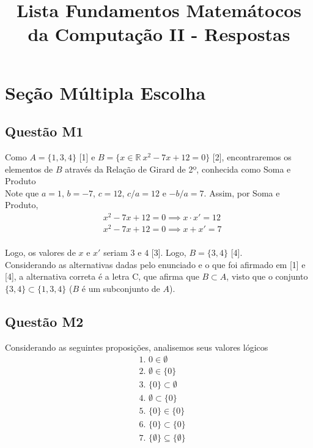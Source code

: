 \documentclass{article}
\title{Lista Fundamentos Matemátocos da Computação II - Respostas}
\begin{document}
\maketitle

\section{Seção Múltipla Escolha}

\subsection{Questão M1} 
Como $A = \{1, 3, 4\}$ [1] e $B = \{ x \in \mathbb{R} \ x^2 - 7x + 12 = 0\}$ [2], encontraremos os elementos de $B$ através da Relação de Girard de 2º, conhecida como Soma e Produto \\

Note que $a = 1$, $b = - 7$, $c = 12$, $c/a = 12$ e $-b/a = 7$. Assim, por Soma e Produto,
\[
\begin{aligned}
& x^2 - 7x + 12 = 0 \implies x \cdot x' = 12 \\
&x^2 - 7x + 12 = 0 \implies x + x' = 7 \\  
\end{aligned}
\]

Logo, os valores de $x$ e $x'$ seriam $3$ e $4$ [3]. Logo, $B = \{3, 4\}$ [4]. \\
Considerando as alternativas dadas pelo enunciado e o que foi afirmado em [1] e [4], a alternativa correta é a letra C, que afirma que $B \subset A$, visto que o conjunto $\{3, 4\} \subset \{1, 3, 4\}$ ($B$ é um subconjunto de $A$).


\subsection{Questão M2}
Considerando as seguintes proposições, analisemos seus valores lógicos 
\[
\begin{aligned}
& \text{1. } 0 \in \emptyset \\
& \text{2. } \emptyset \in \{0\} \\
& \text{3. } \{0\} \subset \emptyset\\
& \text{4. } \emptyset \subset \{0\} \\
& \text{5. } \{0\} \in \{0\} \\
& \text{6. } \{0\} \subset \{0\} \\
& \text{7. } \{\emptyset\} \subseteq \{\emptyset\}
\end{aligned}
\]
\end{document}

